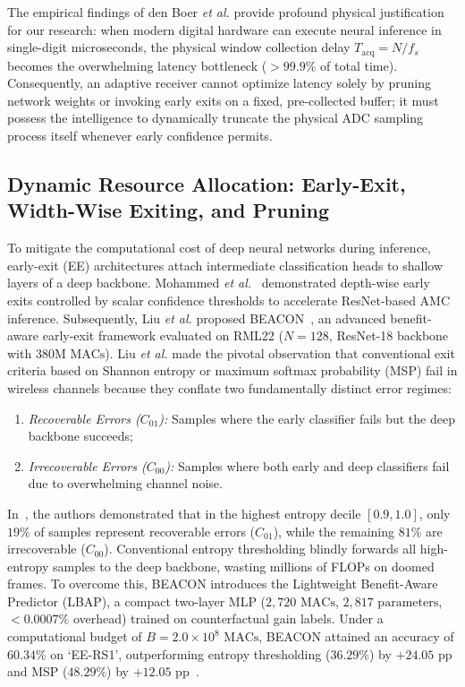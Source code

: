 The empirical findings of den Boer \emph{et al.} provide profound physical justification for our research: when modern digital hardware can execute neural inference in single-digit microseconds, the physical window collection delay $T_{\text{acq}} = N/f_s$ becomes the overwhelming latency bottleneck ($>99.9\%$ of total time). Consequently, an adaptive receiver cannot optimize latency solely by pruning network weights or invoking early exits on a fixed, pre-collected buffer; it must possess the intelligence to dynamically truncate the physical ADC sampling process itself whenever early confidence permits.

\subsection{Dynamic Resource Allocation: Early-Exit, Width-Wise Exiting, and Pruning}
\label{subsec:rel_beacon_pruning}

To mitigate the computational cost of deep neural networks during inference, early-exit (EE) architectures attach intermediate classification heads to shallow layers of a deep backbone. Mohammed \emph{et al.}~\cite{mohammed2023early} demonstrated depth-wise early exits controlled by scalar confidence thresholds to accelerate ResNet-based AMC inference. Subsequently, Liu \emph{et al.} proposed BEACON~\cite{liu2026beacon}, an advanced benefit-aware early-exit framework evaluated on RML22 ($N=128$, ResNet-18 backbone with $380\text{M MACs}$). Liu \emph{et al.} made the pivotal observation that conventional exit criteria based on Shannon entropy or maximum softmax probability (MSP) fail in wireless channels because they conflate two fundamentally distinct error regimes:
\begin{enumerate}
    \item \emph{Recoverable Errors ($C_{01}$):} Samples where the early classifier fails but the deep backbone succeeds;
    \item \emph{Irrecoverable Errors ($C_{00}$):} Samples where both early and deep classifiers fail due to overwhelming channel noise.
\end{enumerate}
In~\cite[Table~I]{liu2026beacon}, the authors demonstrated that in the highest entropy decile $[0.9, 1.0]$, only $19\%$ of samples represent recoverable errors ($C_{01}$), while the remaining $81\%$ are irrecoverable ($C_{00}$). Conventional entropy thresholding blindly forwards all high-entropy samples to the deep backbone, wasting millions of FLOPs on doomed frames. To overcome this, BEACON introduces the Lightweight Benefit-Aware Predictor (LBAP), a compact two-layer MLP ($2,720\text{ MACs}$, $2,817\text{ parameters}$, $<0.0007\%$ overhead) trained on counterfactual gain labels. Under a computational budget of $B = 2.0 \times 10^8\text{ MACs}$, BEACON attained an accuracy of $60.34\%$ on `EE-RS1', outperforming entropy thresholding ($36.29\%$) by $+24.05\text{ pp}$ and MSP ($48.29\%$) by $+12.05\text{ pp}$~\cite[Table~IV]{liu2026beacon}.

